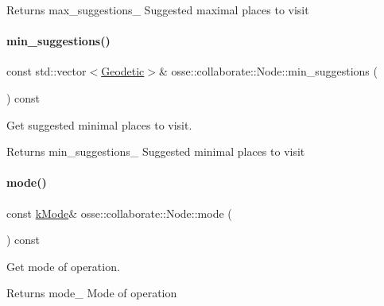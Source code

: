 \begin{DoxyReturn}{Returns}
max\+\_\+suggestions\+\_\+ Suggested maximal places to visit 
\end{DoxyReturn}
\mbox{\label{classosse_1_1collaborate_1_1_node_a5bfc3c5ea5ca059b0154f270dfd8971c}} 
\paragraph{\texorpdfstring{min\+\_\+suggestions()}{min\_suggestions()}}
{\footnotesize\ttfamily const std\+::vector$<$\hyperlink{classosse_1_1collaborate_1_1_geodetic}{Geodetic}$>$\& osse\+::collaborate\+::\+Node\+::min\+\_\+suggestions (\begin{DoxyParamCaption}{ }\end{DoxyParamCaption}) const\hspace{0.3cm}{\ttfamily [inline]}}



Get suggested minimal places to visit. 

\begin{DoxyReturn}{Returns}
min\+\_\+suggestions\+\_\+ Suggested minimal places to visit 
\end{DoxyReturn}
\mbox{\label{classosse_1_1collaborate_1_1_node_a524a1e53ef230698b7d29435c7ff7dae}} 
\paragraph{\texorpdfstring{mode()}{mode()}}
{\footnotesize\ttfamily const \hyperlink{classosse_1_1collaborate_1_1_node_a6f8b0270e42a0c2059d7b554acfbd3db}{k\+Mode}\& osse\+::collaborate\+::\+Node\+::mode (\begin{DoxyParamCaption}{ }\end{DoxyParamCaption}) const\hspace{0.3cm}{\ttfamily [inline]}}



Get mode of operation. 

\begin{DoxyReturn}{Returns}
mode\+\_\+ Mode of operation 
\end{DoxyReturn}
\mbox{\label{classosse_1_1collaborate_1_1_node_a4967cafbc71c566ec34a9ae05849cfbe}} 
